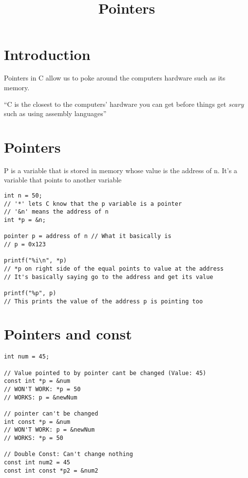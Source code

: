 \documentclass[11pt]{article}
\begin{document}
\title{Pointers}
\maketitle

\section{Introduction}
Pointers in C allow us to poke around the computers hardware such as its memory.
\begin{displayquote}
``C is the closest to the computers’ hardware you can get before things get \emph{scary} such as using assembly languages''
\end{displayquote}

\section{Pointers}
P is a variable that is stored in memory whose value is the address of n. It’s a variable that points to another variable

\begin{verbatim}
int n = 50;
// '*' lets C know that the p variable is a pointer
// '&n' means the address of n
int *p = &n;

pointer p = address of n // What it basically is
// p = 0x123

printf("%i\n", *p)
// *p on right side of the equal points to value at the address
// It's basically saying go to the address and get its value

printf("%p", p)
// This prints the value of the address p is pointing too
\end{verbatim}

\section{Pointers and const}

\begin{verbatim}
int num = 45;

// Value pointed to by pointer cant be changed (Value: 45)
const int *p = &num
// WON'T WORK: *p = 50
// WORKS: p = &newNum

// pointer can't be changed
int const *p = &num
// WON'T WORK: p = &newNum
// WORKS: *p = 50

// Double Const: Can't change nothing
const int num2 = 45
const int const *p2 = &num2
\end{verbatim}
\end{document}
